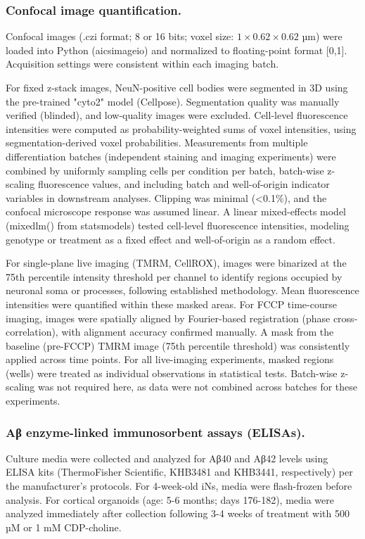 \subsubsection{Confocal image quantification.}
Confocal images (.czi format; 8 or 16 bits; voxel size: $1 \times 0.62 \times 0.62$ µm) were loaded into Python (aicsimageio) and normalized to floating-point format [0,1]. Acquisition settings were consistent within each imaging batch.

For fixed z-stack images, NeuN-positive cell bodies were segmented in 3D using the pre-trained "cyto2" model (Cellpose\supercite{Stringer2021-yn}). Segmentation quality was manually verified (blinded), and low-quality images were excluded. Cell-level fluorescence intensities were computed as probability-weighted sums of voxel intensities, using segmentation-derived voxel probabilities. Measurements from multiple differentiation batches (independent staining and imaging experiments) were combined by uniformly sampling cells per condition per batch, batch-wise z-scaling fluorescence values, and including batch and well-of-origin indicator variables in downstream analyses. Clipping was minimal (<0.1\%), and the confocal microscope response was assumed linear. A linear mixed-effects model (mixedlm() from statsmodels) tested cell-level fluorescence intensities, modeling genotype or treatment as a fixed effect and well-of-origin as a random effect.

For single-plane live imaging (TMRM, CellROX), images were binarized at the 75th percentile intensity threshold per channel to identify regions occupied by neuronal soma or processes, following established methodology\supercite{Esteras2020-md}. Mean fluorescence intensities were quantified within these masked areas. For FCCP time-course imaging, images were spatially aligned by Fourier-based registration (phase cross-correlation), with alignment accuracy confirmed manually. A mask from the baseline (pre-FCCP) TMRM image (75th percentile threshold) was consistently applied across time points. For all live-imaging experiments, masked regions (wells) were treated as individual observations in statistical tests. Batch-wise z-scaling was not required here, as data were not combined across batches for these experiments.

\subsubsection{Aβ enzyme-linked immunosorbent assays (ELISAs).}
Culture media were collected and analyzed for Aβ40 and Aβ42 levels using ELISA kits (ThermoFisher Scientific, KHB3481 and KHB3441, respectively) per the manufacturer's protocols. For 4-week-old iNs, media were flash-frozen before analysis. For cortical organoids (age: 5-6 months; days 176-182), media were analyzed immediately after collection following 3-4 weeks of treatment with 500 µM or 1 mM CDP-choline. 

